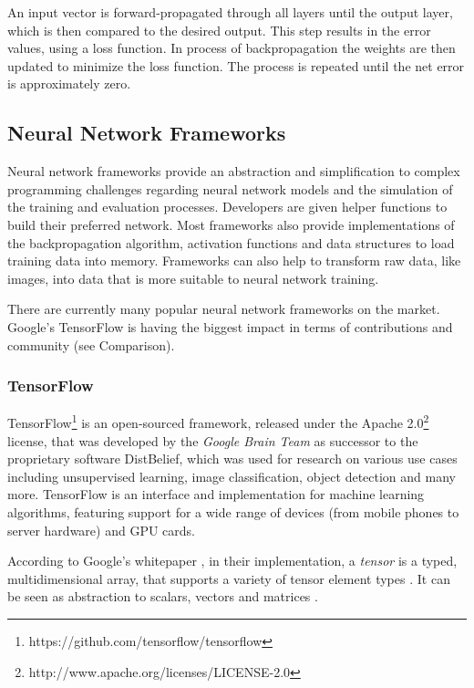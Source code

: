 An input vector is forward-propagated through all layers until the
output layer, which is then compared to the desired output. This step
results in the error values, using a loss function. In process of
backpropagation the weights are then updated to minimize the loss
function. The process is repeated until the net error is approximately
zero. \cite{nn-froehlich}

\subsection{Neural Network Frameworks}\label{neural-network-frameworks}

Neural network frameworks provide an abstraction and simplification to
complex programming challenges \cite{dzone-frameworks} regarding neural
network models and the simulation of the training and evaluation
processes. Developers are given helper functions to build their
preferred network. Most frameworks also provide implementations of the
backpropagation algorithm, activation functions and data structures to
load training data into memory. Frameworks can also help to transform
raw data, like images, into data that is more suitable to neural network
training.

There are currently many popular neural network frameworks on the
market. Google's TensorFlow is having the biggest impact in terms of
contributions and community (see Comparison).

\subsubsection{TensorFlow}\label{tensorflow}

TensorFlow\footnote{https://github.com/tensorflow/tensorflow} is an
open-sourced framework, released under the Apache 2.0\footnote{http://www.apache.org/licenses/LICENSE-2.0}
license, that was developed by the \emph{Google Brain Team} as successor
to the proprietary software DistBelief, which was used for research on
various use cases including unsupervised learning, image classification,
object detection and many more. TensorFlow is an interface and
implementation for machine learning algorithms, featuring support for a
wide range of devices (from mobile phones to server hardware) and GPU
cards. \cite{dean-tensor}

According to Google's whitepaper \cite{dean-tensor}, in their
implementation, a \emph{tensor} is a typed, multidimensional array, that
supports a variety of tensor element types . It can be seen as
abstraction to scalars, vectors and matrices \cite{raschka2017machine}.

